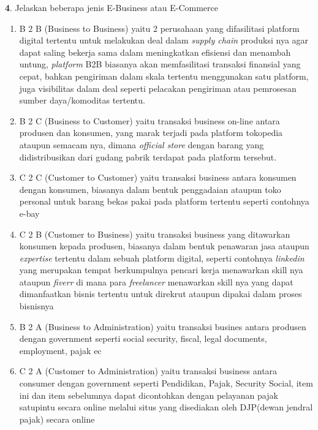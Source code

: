 \documentclass{article}
\begin{document}
\noindent\textbf{4}. Jelaskan beberapa jenis E-Business atau E-Commerce
\begin{enumerate}
    \item B 2 B (Business to Business) yaitu 2 perusahaan yang difasilitasi platform digital tertentu 
    untuk melakukan deal dalam \emph{supply chain} produksi nya agar dapat 
    saling bekerja sama dalam meningkatkan efisiensi 
    dan menambah untung, \emph{platform} B2B biasanya 
    akan memfasilitasi transaksi finansial yang cepat, bahkan pengiriman dalam skala tertentu menggunakan satu platform, juga visibilitas dalam deal seperti pelacakan pengiriman atau pemrosesan sumber daya/komoditas tertentu.
    \item B 2 C (Business to Customer) yaitu transaksi business on-line antara produsen dan konsumen, yang marak terjadi pada platform tokopedia ataupun semacam nya, dimana \emph{official store} dengan barang yang didistribusikan dari gudang pabrik terdapat pada platform tersebut.
    \item C 2 C (Customer to Customer) yaitu transaksi business antara konsumen dengan konsumen, biasanya dalam 
    bentuk penggadaian ataupun toko personal untuk barang bekas pakai pada platform tertentu seperti contohnya e-bay
    \item C 2 B (Customer to Business) yaitu transaksi business yang 
    ditawarkan konsumen kepada produsen, biasanya dalam bentuk penawaran jasa ataupun \emph{expertise} tertentu dalam sebuah platform digital, seperti contohnya \emph{linkedin} yang merupakan tempat berkumpulnya pencari kerja menawarkan skill nya ataupun \emph{fiverr} di mana para \emph{freelancer} menawarkan skill nya yang dapat dimanfaatkan bisnis tertentu untuk direkrut ataupun dipakai dalam proses bisnisnya
    \item B 2 A (Business to Administration) yaitu transaksi busines antara produsen dengan government seperti social security, fiscal, legal documents, employment, pajak ec 
    \item C 2 A (Customer to Administration) yaitu transaksi business antara consumer dengan government seperti Pendidikan, Pajak, Security Social, item ini dan item sebelumnya dapat dicontohkan dengan pelayanan pajak satupintu secara online melalui situs yang disediakan oleh DJP(dewan jendral pajak) secara online
\end{enumerate}
\end{document}
